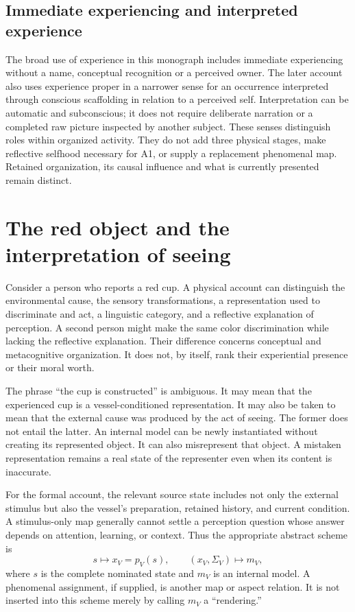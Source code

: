 \subsection*{Immediate experiencing and interpreted experience}
The broad use of experience in this monograph includes immediate experiencing without a name, conceptual recognition or a perceived owner. The later account also uses experience proper in a narrower sense for an occurrence interpreted through conscious scaffolding in relation to a perceived self. Interpretation can be automatic and subconscious; it does not require deliberate narration or a completed raw picture inspected by another subject. These senses distinguish roles within organized activity. They do not add three physical stages, make reflective selfhood necessary for A1, or supply a replacement phenomenal map. Retained organization, its causal influence and what is currently presented remain distinct.

\section{The red object and the interpretation of seeing}\label{section:distinctions:the-red-object-and-the-interpretation-of-seeing}
Consider a person who reports a red cup. A physical account can distinguish the environmental cause, the sensory transformations, a representation used to discriminate and act, a linguistic category, and a reflective explanation of perception. A second person might make the same color discrimination while lacking the reflective explanation. Their difference concerns conceptual and metacognitive organization. It does not, by itself, rank their experiential presence or their moral worth.

The phrase ``the cup is constructed'' is ambiguous. It may mean that the experienced cup is a vessel-conditioned representation. It may also be taken to mean that the external cause was produced by the act of seeing. The former does not entail the latter. An internal model can be newly instantiated without creating its represented object. It can also misrepresent that object. A mistaken representation remains a real state of the representer even when its content is inaccurate.

For the formal account, the relevant source state includes not only the external stimulus but also the vessel's preparation, retained history, and current condition. A stimulus-only map generally cannot settle a perception question whose answer depends on attention, learning, or context. Thus the appropriate abstract scheme is
\[
s\longmapsto x_V=p_V(s),\qquad
(x_V,\Sigma_V)\longmapsto m_V,
\]
where $s$ is the complete nominated state and $m_V$ is an internal model. A phenomenal assignment, if supplied, is another map or aspect relation. It is not inserted into this scheme merely by calling $m_V$ a ``rendering.''

